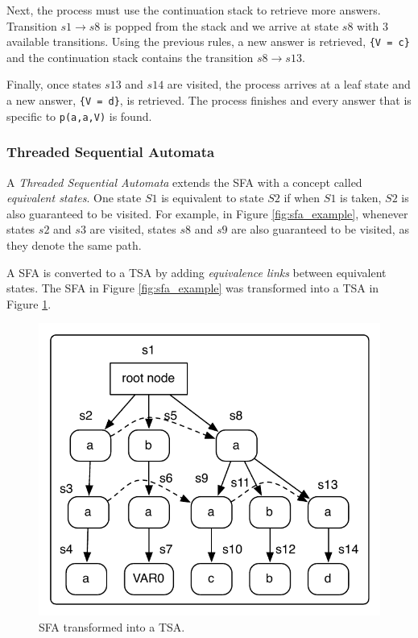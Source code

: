 Next, the process must use the continuation stack to retrieve more answers. Transition $s1 \rightarrow s8$ is popped from the stack
and we arrive at state $s8$ with 3 available transitions. Using the previous rules, a new answer is retrieved,
\texttt{\{V = c\}} and the continuation stack contains the transition $s8 \rightarrow s13$.

Finally, once states $s13$ and $s14$ are visited, the process arrives at a leaf state and a new answer,
\texttt{\{V = d\}}, is retrieved. The process finishes and every answer that is specific to \texttt{p(a,a,V)} is found.

\subsubsection{Threaded Sequential Automata}

A \textit{Threaded Sequential Automata} extends the SFA with a concept called
\textit{equivalent states}. One state $S1$ is equivalent to state $S2$ if when $S1$ is taken, $S2$ is also
guaranteed to be visited. For example, in Figure \ref{fig:sfa_example}, whenever states $s2$ and $s3$ are
visited, states $s8$ and $s9$ are also guaranteed to be visited, as they denote the same path.

A SFA is converted to a TSA by adding \textit{equivalence links} between equivalent states.
The SFA in Figure \ref{fig:sfa_example} was transformed into a TSA in Figure \ref{fig:tsa_example}.

\begin{figure}[ht]
  \centering
    \includegraphics[scale=0.6]{tsa.pdf}
  \caption{SFA transformed into a TSA.}
  \label{fig:tsa_example}
\end{figure}

